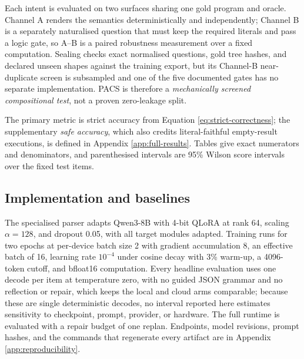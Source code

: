 Each intent is evaluated on two surfaces sharing one gold program and oracle.  Channel A renders
the semantics deterministically and independently; Channel B is a separately naturalised question
that must keep the required literals and pass a logic gate, so A--B is a paired robustness
measurement over a fixed computation.  Sealing checks exact normalised questions, gold tree
hashes, and declared unseen shapes against the training export, but its Channel-B near-duplicate
screen is subsampled and one of the five documented gates has no separate implementation.  PACS
is therefore a \emph{mechanically screened compositional test}, not a proven zero-leakage split.

The primary metric is strict accuracy from Equation \ref{eq:strict-correctness}; the
supplementary \emph{safe accuracy}, which also credits literal-faithful empty-result executions,
is defined in Appendix \ref{app:full-results}.  Tables give exact numerators and denominators,
and parenthesised intervals are 95\% Wilson score intervals over the fixed test items.

\subsection{Implementation and baselines}
\label{sec:implementation}

The specialised parser adapts Qwen3-8B with 4-bit QLoRA at rank 64, scaling $\alpha=128$, and
dropout 0.05, with all target modules adapted.  Training runs for two epochs at per-device batch
size 2 with gradient accumulation 8, an effective batch of 16, learning rate $10^{-4}$ under
cosine decay with 3\% warm-up, a 4096-token cutoff, and bfloat16 computation.  Every headline
evaluation uses one decode per item at temperature zero, with no guided JSON grammar and no
reflection or repair, which keeps the local and cloud arms comparable; because these are single
deterministic decodes, no interval reported here estimates sensitivity to checkpoint, prompt,
provider, or hardware.  The full runtime is evaluated with a repair budget of one replan.
Endpoints, model revisions, prompt hashes, and the commands that regenerate every artifact are in
Appendix \ref{app:reproducibility}.

